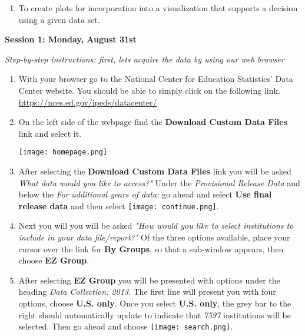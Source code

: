 \documentclass{article}
\begin{document}
{\begin{enumerate}[leftmargin=15mm]
\item To create plots for incorporation into a visualization that supports a decision using a given data set.

\end{enumerate}

\large{\textbf{Session 1: Monday, August 31st}}

\vspace{4mm}
\setlength{\leftskip}{1cm}
\textit{Step-by-step instructions: first, lets acquire the data by using our web browser}

\begin{enumerate}[leftmargin=15mm]

\item With your browser go to the National Center for Education Statistics' Data Center website.  You should be able to simply click on the following link.\\ 
\url{https://nces.ed.gov/ipeds/datacenter/}

\item On the left side of the webpage find the \textbf{Download Custom Data Files} link and select it.  
\begin{flushright}{\texttt{[image: homepage.png]}}\end{flushright}
 
\item After selecting the \textbf{Download Custom Data Files} link you will be asked \textit{What data would you like to access?"} Under the \textit{Provisional Release Data} and below the \textit{For additional years of data:} go ahead and select \textbf{Use final release data} and then select \texttt{[image: continue.png]}.

\item Next you will you will be asked \textit{"How would you like to select institutions to include in your data file/report?"}  Of the three options available, place your cursor over the link for \textbf{By Groups}, so that a sub-window appears, then choose \textbf{EZ Group}.

\item After selecting \textbf{EZ Group} you will be presented with options under the heading \textit{Data Collection: 2013}.  The first line will present you with four options, choose \textbf{U.S. only}.  Once you select \textbf{U.S. only}, the grey bar to the right should automatically update to indicate that \textit{7597} institutions will be selected.  Then go ahead and choose \texttt{[image: search.png]}.


\end{enumerate}}
\end{document}
